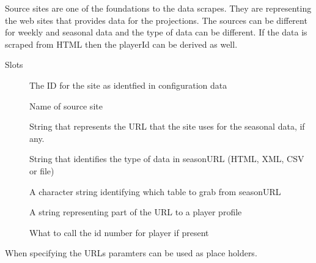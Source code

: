 \documentclass[a4paper]{book}
\begin{document}
%
\begin{Description}\relax
Source sites are one of the foundations to the data scrapes. They are
representing the web sites that provides data for the projections. The
sources can be different for weekly and seasonal data and the type of
data can be different. If the data is scraped from HTML then the playerId
can be derived as well.
\end{Description}
%
\begin{Section}{Slots}

\begin{description}

\item[] The ID for the site as identfied in configuration data

\item[] Name of source site

\item[] String that represents the URL that the site uses for the seasonal data, if any.

\item[] String that identifies the type of data in  seasonURL (HTML, XML, CSV or file)

\item[] A character string identifying which table to grab from seasonURL

\item[] A string representing part of the URL to a player profile

\item[] What to call the id number for player if present

\end{description}
\end{Section}
%
\begin{Note}\relax
When specifying the URLs paramters can be used as place holders.
\end{Note}
%
\begin{Examples}
\end{Examples}
\end{document}
